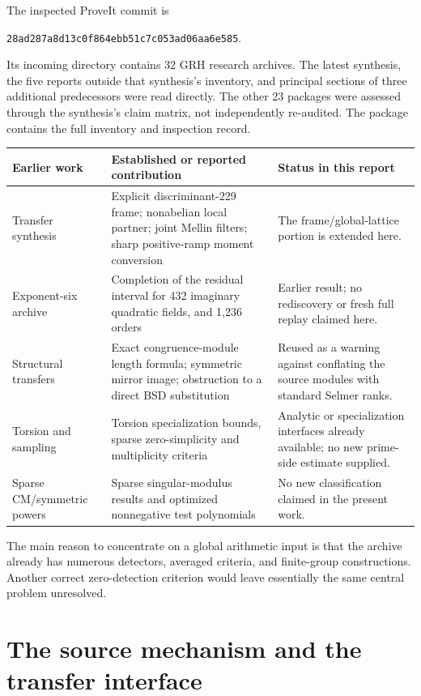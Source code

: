 The inspected ProveIt commit is
\begin{center}\texttt{28ad287a8d13c0f864ebb51c7c053ad06aa6e585}.\end{center}
Its incoming directory contains 32 GRH research archives. The latest synthesis, the five reports outside that synthesis's inventory, and principal sections of three additional predecessors were read directly. The other 23 packages were assessed through the synthesis's claim matrix, not independently re-audited. The package contains the full inventory and inspection record.\cite{priorSynthesis,priorStructural,priorSampling,priorZeroData,priorExact,priorSparse}

\begin{longtable}{@{}L{.25\textwidth}L{.41\textwidth}L{.27\textwidth}@{}}
\toprule
Earlier work & Established or reported contribution & Status in this report\\
\midrule\endhead
Transfer synthesis & Explicit discriminant-229 frame; nonabelian local partner; joint Mellin filters; sharp positive-ramp moment conversion & The frame/global-lattice portion is extended here.\\[5pt]
Exponent-six archive & Completion of the residual interval for 432 imaginary quadratic fields, and 1,236 orders & Earlier result; no rediscovery or fresh full replay claimed here.\\[5pt]
Structural transfers & Exact congruence-module length formula; symmetric mirror image; obstruction to a direct BSD substitution & Reused as a warning against conflating the source modules with standard Selmer ranks.\\[5pt]
Torsion and sampling & Torsion specialization bounds, sparse zero-simplicity and multiplicity criteria & Analytic or specialization interfaces already available; no new prime-side estimate supplied.\\[5pt]
Sparse CM/symmetric powers & Sparse singular-modulus results and optimized nonnegative test polynomials & No new classification claimed in the present work.\\
\bottomrule
\end{longtable}

The main reason to concentrate on a global arithmetic input is that the archive already has numerous detectors, averaged criteria, and finite-group constructions. Another correct zero-detection criterion would leave essentially the same central problem unresolved.

\section{The source mechanism and the transfer interface}

